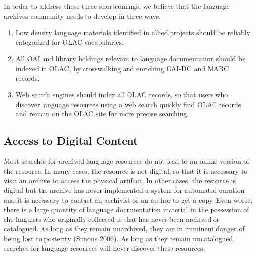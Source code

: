 
In order to address these three shortcomings, we believe that the
language archives community needs to develop in three ways:

\begin{enumerate}\setlength{\itemsep}{0pt}
\item Low density language materials identified in allied projects
      should be reliably categorized for OLAC vocabularies.
\item All OAI and library holdings relevant to language
      documentation should be indexed in OLAC, by
      crosswalking and enriching OAI-DC and MARC records.
\item Web search engines should index all OLAC records, so that
      users who discover language resources using a web search
      quickly find OLAC records and remain on the OLAC site for
      more precise searching.
\end{enumerate}

\subsection{Access to Digital Content}



Most searches for archived language resources do not lead to an online version
of the resource.  In many cases, the resource is not digital, so
that it is necessary to visit an archive to access the physical artifact.
In other cases, the resource is digital but the archive has never
implemented a system for automated curation and it is necessary to
contact an archivist or an author to get a copy.  Even worse, there is a large quantity of language
documentation material in the possession of the linguists who
originally collected it that has never been archived or catalogued.
As long as they remain unarchived, they are in imminent danger of
being lost to posterity (Simons 2006). 
As long as they remain uncatalogued, searches for language resources
will never discover these resources.


